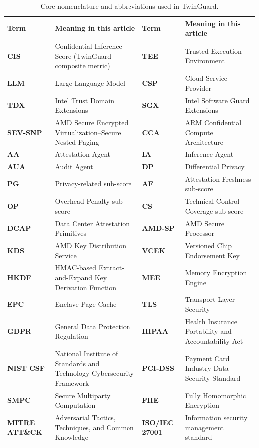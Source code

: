 \documentclass{ieeeaccess}
\begin{document}
\begin{table}[t]
\caption{Core nomenclature and abbreviations used in TwinGuard.}
\label{tab:nomenclature}
\centering
\footnotesize
\setlength{\tabcolsep}{3pt}
\renewcommand{\arraystretch}{1.08}
\begin{tabular}{@{}
  >{\centering\arraybackslash\bfseries}p{}
  >{\raggedright\arraybackslash}p{}
  >{\centering\arraybackslash\bfseries}p{}
  >{\raggedright\arraybackslash}p{}@{}}
\toprule
\textbf{Term} & \textbf{Meaning in this article} &
\textbf{Term} & \textbf{Meaning in this article} \\
\midrule
CIS & Confidential Inference Score (TwinGuard composite metric) &
TEE & Trusted Execution Environment \\
LLM & Large Language Model &
CSP & Cloud Service Provider \\
TDX & Intel Trust Domain Extensions &
SGX & Intel Software Guard Extensions \\
SEV-SNP & AMD Secure Encrypted Virtualization--Secure Nested Paging &
CCA & ARM Confidential Compute Architecture \\
AA & Attestation Agent &
IA & Inference Agent \\
AUA & Audit Agent &
DP & Differential Privacy \\
PG & Privacy-related sub-score &
AF & Attestation Freshness sub-score \\
OP & Overhead Penalty sub-score &
CS & Technical-Control Coverage sub-score \\
DCAP & Data Center Attestation Primitives &
AMD-SP & AMD Secure Processor \\
KDS & AMD Key Distribution Service &
VCEK & Versioned Chip Endorsement Key \\
HKDF & HMAC-based Extract-and-Expand Key Derivation Function &
MEE & Memory Encryption Engine \\
EPC & Enclave Page Cache &
TLS & Transport Layer Security \\
GDPR & General Data Protection Regulation &
HIPAA & Health Insurance Portability and Accountability Act \\
NIST CSF & National Institute of Standards and Technology Cybersecurity Framework &
PCI-DSS & Payment Card Industry Data Security Standard \\
SMPC & Secure Multiparty Computation &
FHE & Fully Homomorphic Encryption \\
MITRE ATT\&CK & Adversarial Tactics, Techniques, and Common Knowledge &
ISO/IEC 27001 & Information security management standard \\
\bottomrule
\end{tabular}
\end{table}
\end{document}
